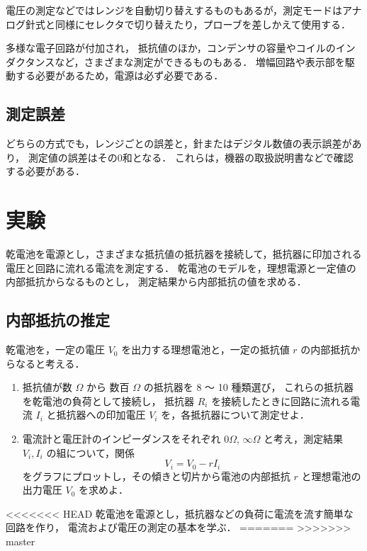 \documentclass[11pt,sort]{jarticle}
\begin{document}
電圧の測定などではレンジを自動切り替えするものもあるが，測定モードはアナログ針式と同様にセレクタで切り替えたり，プローブを差しかえて使用する．

多様な電子回路が付加され，
抵抗値のほか，コンデンサの容量やコイルのインダクタンスなど，さまざまな測定ができるものもある．
増幅回路や表示部を駆動する必要があるため，電源は必ず必要である．

\subsection{測定誤差}

どちらの方式でも，レンジごとの誤差と，針またはデジタル数値の表示誤差があり，
測定値の誤差はその0和となる．
これらは，機器の取扱説明書などで確認する必要がある．

\newpage
\section{実験}

乾電池を電源とし，さまざまな抵抗値の抵抗器を接続して，抵抗器に印加される電圧と回路に流れる電流を測定する．
乾電池のモデルを，理想電源と一定値の内部抵抗からなるものとし，
測定結果から内部抵抗の値を求める．

\subsection{内部抵抗の推定}\label{a}

乾電池を，一定の電圧 $V_0$ を出力する理想電池と，一定の抵抗値 $r$ の内部抵抗からなると考える．

\begin{enumerate}
\item
抵抗値が数 $\Omega$ から 数百 $\Omega$ の抵抗器を 8 〜 10 種類選び，
これらの抵抗器を乾電池の負荷として接続し，
抵抗器 $R_i$ を接続したときに回路に流れる電流 $I_i$ と抵抗器への印加電圧 $V_i$ を，各抵抗器について測定せよ．
\item
電流計と電圧計のインピーダンスをそれぞれ $0 \Omega$, $\infty \Omega$ と考え，測定結果 $V_i, I_i$ の組について，関係
\[
V_i = V_0 - r I_i
\]
をグラフにプロットし，その傾きと切片から電池の内部抵抗 $r$ と理想電池の出力電圧 $V_0$ を求めよ．
\end{enumerate}

<<<<<<< HEAD
乾電池を電源とし，抵抗器などの負荷に電流を流す簡単な回路を作り，
電流および電圧の測定の基本を学ぶ．
=======
>>>>>>> master
\end{document}
